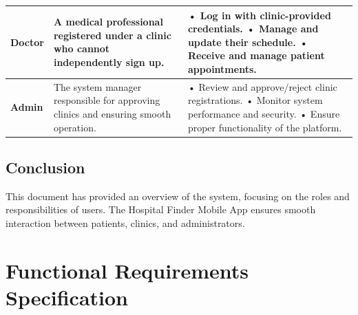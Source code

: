 \documentclass[12pt]{report}
\begin{document}
\begin{longtable}{|p{3cm}|p{6cm}|p{6cm}|}
	\hspace*{0.85cm}\textbf{Doctor}                                                                                            & A medical professional registered under a clinic who cannot independently sign up.  &
	• Log in with clinic-provided credentials.\newline
	• Manage and update their schedule.\newline
	• Receive and manage patient appointments.                                                                                                                                                                             \\
	\hline

	\hspace*{0.85cm}\textbf{Admin}                                                                                             & The system manager responsible for approving clinics and ensuring smooth operation. &
	• Review and approve/reject clinic registrations.\newline
	• Monitor system performance and security.\newline
	• Ensure proper functionality of the platform.                                                                                                                                                                         \\
	\hline

\end{longtable}




























\subsection{Conclusion}
This document has provided an overview of the system, focusing on the roles and responsibilities of users. The Hospital Finder Mobile App ensures smooth interaction between patients, clinics, and administrators.
\vspace{0.5cm}
\section{\textbf{Functional Requirements Specification}}
\end{document}

